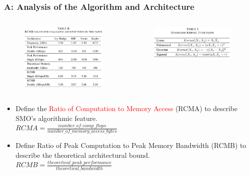 \documentclass{beamer}
\begin{document}
\begin{frame}
	\frametitle{A: Analysis of the Algorithm and Architecture}
	\begin{columns}[c] %
		
		\begin{figure}
		\includegraphics[width=0.8\textwidth]{fig/table2_rcmb.png}
			
		\end{figure}
		
			\includegraphics[width=0.8\textwidth]{fig/table1_kernel.png}
				

	\end{columns}	
	\begin{itemize}
		\item Define the \textcolor{red}{Ratio of Computation to Memory Access}
		(RCMA) to describe SMO’s algorithmic feature. \\
		$RCMA=\frac{number\_of\_comp\_flops}{number\_of\_memory\_access\_bytes}$
		\item Define Ratio of Peak Computation to Peak Memory Bandwidth (RCMB)
		to describe the theoretical architectural bound. \\ 
		$RCMB=\frac{theoretical\_peak\_performance}{theoretical\_bandwidth}$		
	\end{itemize}	
\end{frame}
\end{document}
